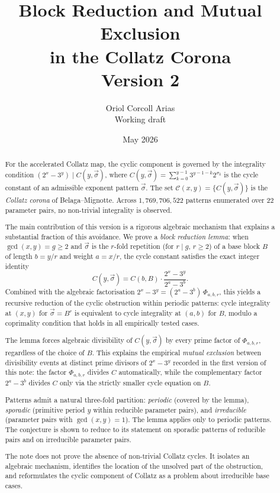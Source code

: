 \documentclass[11pt,a4paper]{article}
\title{Block Reduction and Mutual Exclusion\\
in the Collatz Corona\\
\large Version 2}
\author{Oriol Corcoll Arias\\
\small Working draft}
\date{May 2026}
\theoremstyle{plain}
\theoremstyle{definition}
\begin{document}
\maketitle

\begin{abstract}
For the accelerated Collatz map, the cyclic component is governed by the
integrality condition $(2^x - 3^y) \mid C(y, \vec\sigma)$, where
$C(y, \vec\sigma) = \sum_{k=0}^{y-1} 3^{y-1-k} 2^{\sigma_k}$ is the cycle
constant of an admissible exponent pattern $\vec\sigma$. The set
$\mathcal{C}(x, y) = \{C(y, \vec\sigma)\}$ is the \emph{Collatz corona} of
Belaga--Mignotte. Across $1{,}769{,}706{,}522$ patterns enumerated over 22
parameter pairs, no non-trivial integrality is observed.

The main contribution of this version is a rigorous algebraic mechanism that
explains a substantial fraction of this avoidance. We prove a
\emph{block reduction lemma}: when $\gcd(x, y) = g \geq 2$ and $\vec\sigma$
is the $r$-fold repetition (for $r \mid g$, $r \geq 2$) of a base block $B$
of length $b = y/r$ and weight $a = x/r$, the cycle constant satisfies the
exact integer identity
\[
C(y, \vec\sigma) = C(b, B) \cdot \frac{2^x - 3^y}{2^a - 3^b}.
\]
Combined with the algebraic factorisation
$2^x - 3^y = (2^a - 3^b) \, \Phi_{a, b, r}$,
this yields a recursive reduction of the cyclic obstruction within periodic
patterns: cycle integrality at $(x, y)$ for $\vec\sigma = B^r$ is equivalent
to cycle integrality at $(a, b)$ for $B$, modulo a coprimality condition
that holds in all empirically tested cases.

The lemma forces algebraic divisibility of $C(y, \vec\sigma)$ by every prime
factor of $\Phi_{a, b, r}$, regardless of the choice of $B$. This explains
the empirical \emph{mutual exclusion} between divisibility events at distinct
prime divisors of $2^x - 3^y$ recorded in the first version of this note: the
factor $\Phi_{a, b, r}$ divides $C$ automatically, while the complementary
factor $2^a - 3^b$ divides $C$ only via the strictly smaller cycle equation
on $B$.

Patterns admit a natural three-fold partition: \emph{periodic} (covered by
the lemma), \emph{sporadic} (primitive period $y$ within reducible parameter
pairs), and \emph{irreducible} (parameter pairs with $\gcd(x, y) = 1$). The
lemma applies only to periodic patterns. The conjecture is shown to reduce
to its statement on sporadic patterns of reducible pairs and on irreducible
parameter pairs.

The note does not prove the absence of non-trivial Collatz cycles. It
isolates an algebraic mechanism, identifies the location of the unsolved
part of the obstruction, and reformulates the cyclic component of Collatz
as a problem about irreducible base cases.
\end{abstract}
\end{document}

